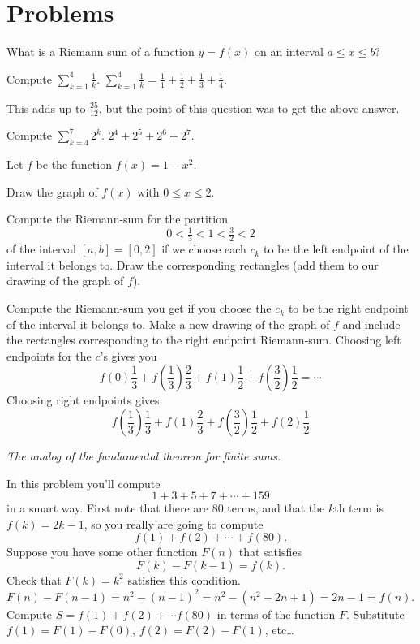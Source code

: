 \section{Problems}
\problemfont
\begin{multicols}{2}\setlength{\parindent}{0pt}
\problem 
\subprob What is a Riemann sum of a function $y=f(x)$ on an interval $a\leq
x \leq b$?

\subprob Compute $\sum_{k=1}^4 \frac{1}{k}$.
\answer
$\sum_{k=1}^4 \frac{1}{k}
= \frac{1}{1} +  \frac{1}{2} + \frac{1}{3} + \frac{1}{4}$.

This adds up to $\frac{25}{12}$, but the point of this question was to get the
above answer.
\endanswer

\subprob Compute $\sum_{k=4}^7 2^k$.
\answer
$2^4 + 2^5 +2^6 + 2^7$.
\endanswer

\problem Let $f$ be the function $f(x) = 1-x^2$.

\subprob Draw the graph of $f(x)$ with $0\le x\le2$.

\subprob Compute the Riemann-sum for the partition
\[
0<\tfrac13<1<\tfrac32<2
\]
of the interval $[a, b] = [0, 2]$ if we choose each $c_k$ to be the
left endpoint of the interval it belongs to.  Draw the corresponding
rectangles (add them to our drawing of the graph of $f$).

\subprob Compute the Riemann-sum you
get if you choose the $c_k$ to be the
right endpoint of the interval it belongs to.  Make a new drawing of
the graph of $f$ and include the rectangles corresponding to the right
endpoint Riemann-sum.
\answer
Choosing left endpoints for the $c$'s gives you
\[
f(0)\frac13 + f(\frac13)\frac23 + f(1)\frac12 + f(\frac32)\frac12
=\cdots
\]
Choosing right endpoints gives
\[
f(\frac13)\frac13 + f(1)\frac23 + f(\frac32)\frac12 + f(2)\frac12
\]
\endanswer

\problem \itshape The analog of the fundamental theorem for finite sums.\upshape

In this problem you'll compute 
\[
  1+3+5+7+\cdots+159
\]
in a smart way.  First note that there are $80$ terms, and that the $k$th term
is $f(k) = 2k-1$, so you really are going to compute
\[
  f(1) + f(2) + \cdots + f(80).
\]
Suppose you have some other function $F(n)$ that satisfies
\[
  F(k)-F(k-1) = f(k).
\]
\subprob Check that $F(k) = k^2$ satisfies this condition.
\answer
$F(n) - F(n-1) = n^2 - (n-1)^2 = n^2 - (n^2-2n+1) = 2n-1 = f(n)$.
\endanswer
\subprob Compute $S = f(1)+f(2)+\cdots f(80)$ in terms of the function
$F$.  
\answer
Substitute $f(1) = F(1) - F(0)$, $f(2) = F(2) - F(1)$, etc\ldots 


\end{multicols}
